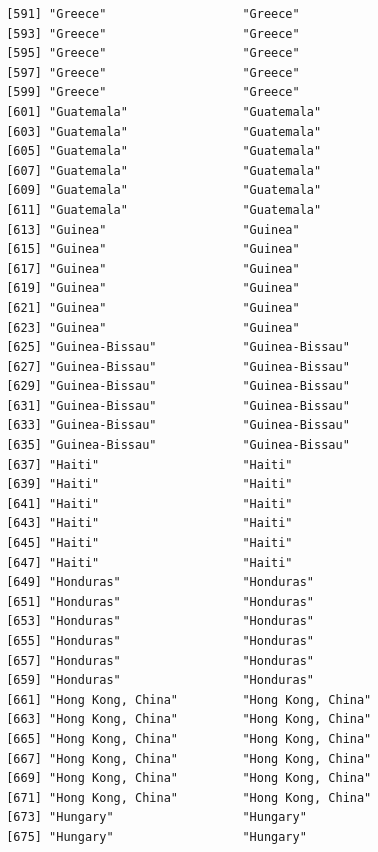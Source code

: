 \documentclass[
  letterpaper,
  DIV=11,
  numbers=noendperiod]{scrreprt}
\begin{document}
\begin{verbatim}
 [591] "Greece"                   "Greece"                  
 [593] "Greece"                   "Greece"                  
 [595] "Greece"                   "Greece"                  
 [597] "Greece"                   "Greece"                  
 [599] "Greece"                   "Greece"                  
 [601] "Guatemala"                "Guatemala"               
 [603] "Guatemala"                "Guatemala"               
 [605] "Guatemala"                "Guatemala"               
 [607] "Guatemala"                "Guatemala"               
 [609] "Guatemala"                "Guatemala"               
 [611] "Guatemala"                "Guatemala"               
 [613] "Guinea"                   "Guinea"                  
 [615] "Guinea"                   "Guinea"                  
 [617] "Guinea"                   "Guinea"                  
 [619] "Guinea"                   "Guinea"                  
 [621] "Guinea"                   "Guinea"                  
 [623] "Guinea"                   "Guinea"                  
 [625] "Guinea-Bissau"            "Guinea-Bissau"           
 [627] "Guinea-Bissau"            "Guinea-Bissau"           
 [629] "Guinea-Bissau"            "Guinea-Bissau"           
 [631] "Guinea-Bissau"            "Guinea-Bissau"           
 [633] "Guinea-Bissau"            "Guinea-Bissau"           
 [635] "Guinea-Bissau"            "Guinea-Bissau"           
 [637] "Haiti"                    "Haiti"                   
 [639] "Haiti"                    "Haiti"                   
 [641] "Haiti"                    "Haiti"                   
 [643] "Haiti"                    "Haiti"                   
 [645] "Haiti"                    "Haiti"                   
 [647] "Haiti"                    "Haiti"                   
 [649] "Honduras"                 "Honduras"                
 [651] "Honduras"                 "Honduras"                
 [653] "Honduras"                 "Honduras"                
 [655] "Honduras"                 "Honduras"                
 [657] "Honduras"                 "Honduras"                
 [659] "Honduras"                 "Honduras"                
 [661] "Hong Kong, China"         "Hong Kong, China"        
 [663] "Hong Kong, China"         "Hong Kong, China"        
 [665] "Hong Kong, China"         "Hong Kong, China"        
 [667] "Hong Kong, China"         "Hong Kong, China"        
 [669] "Hong Kong, China"         "Hong Kong, China"        
 [671] "Hong Kong, China"         "Hong Kong, China"        
 [673] "Hungary"                  "Hungary"                 
 [675] "Hungary"                  "Hungary"                 

\end{verbatim}
\end{document}
